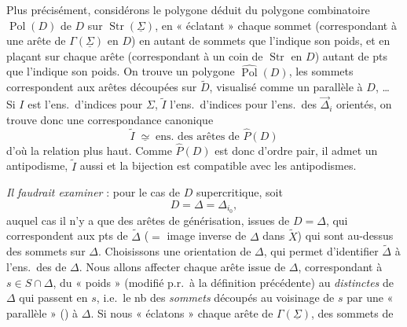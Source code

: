 \documentclass[11pt,a4paper]{article}
\begin{document}
Plus précisément, considérons le polygone  déduit du polygone combinatoire $\operatorname{Pol}(D)$ de $D$ sur $\operatorname{Str}(\underline{\Sigma})$, en « éclatant » chaque sommet (correspondant à une arête de $\Gamma(\underline{\Sigma})$ en $D$) en autant de sommets que l'indique son poids, et en plaçant sur chaque arête (correspondant à un coin de $\operatorname{Str}$ en $D$) autant de pts que l'indique son poids. On trouve un polygone $\widehat{\operatorname{Pol}}(D)$, \struck{\ill{}}  les sommets correspondent aux arêtes découpées sur \struck{\ill{}} $\widetilde{D}$, visualisé comme un  parallèle à $D$, \ldots{}  Si $I$ est l'ens.\ d'indices pour $\Sigma$, $\widetilde{I}$ l'ens.\ d'indices pour l'ens.\ des $\overrightarrow{\Delta}_i$ orientés, on trouve donc une correspondance  canonique
\[
\widetilde{I} \;\underline{\simeq}\; \text{ens.\ des arêtes de } \widehat{P}(D)
\]
d'où la relation \struck{\ill{}}  plus haut. \struck{\ill{}} Comme $\widehat{P}(D)$ est donc d'ordre pair, il admet un antipodisme, $\widetilde{I}$ aussi et la bijection est compatible avec les antipodismes.

 \emph{Il faudrait examiner} : pour le cas de $D$ supercritique, soit
\[
D = \Delta = \Delta_{i_0},
\]
auquel cas il n'y a que des arêtes de générisation, issues de $D = \Delta$, qui correspondent aux pts de $\widetilde{\Delta}$ ($=$ image inverse de $\Delta$ dans $\widetilde{X}$) qui sont au-dessus des sommets sur $\Delta$. Choisissons une orientation de $\Delta$, qui permet d'identifier $\widetilde{\Delta}$ à l'ens.\ des  de $\Delta$. Nous allons affecter chaque arête  issue de $\Delta$, correspondant à $s \in S \cap \Delta$, du « poids » \struck{\ill{}} (modifié p.r.\ à la définition précédente) \struck{\ill{}}  au  \emph{distinctes} de $\Delta$ qui \struck{\ill{}} passent en $s$, i.e.\ le nb des \emph{sommets} découpés au voisinage de $s$ par une « parallèle » () à $\Delta$. Si nous « éclatons » chaque arête de $\Gamma(\underline{\Sigma})$, \struck{\ill{}} des sommets de
\end{document}
